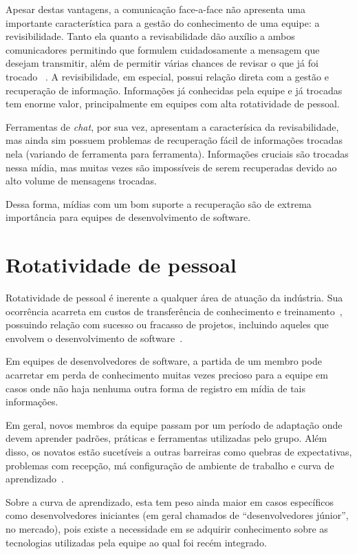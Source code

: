 Apesar destas vantagens, a comunicação face-a-face não apresenta uma importante característica para a gestão do conhecimento de uma equipe: a revisibilidade. Tanto ela quanto a revisabilidade dão auxílio a ambos comunicadores permitindo que formulem cuidadosamente a mensagem que desejam transmitir, além de permitir várias chances de revisar o que já foi trocado ~\cite{Olson2000}. A revisibilidade, em especial, possui relação direta com a gestão e recuperação de informação. Informações já conhecidas pela equipe e já trocadas tem enorme valor, principalmente em equipes com alta rotatividade de pessoal.

Ferramentas de \textit{chat}, por sua vez, apresentam a caracterísica da revisabilidade, mas ainda sim possuem problemas de recuperação fácil de informações trocadas nela (variando de ferramenta para ferramenta). Informações cruciais são trocadas nessa mídia, mas muitas vezes são impossíveis de serem recuperadas devido ao alto volume de mensagens trocadas.

Dessa forma, mídias com um bom suporte a recuperação são de extrema importância para equipes de desenvolvimento de software.

\section{Rotatividade de pessoal}

Rotatividade de pessoal é inerente a qualquer área de atuação da indústria.
Sua ocorrência acarreta em custos de transferência de conhecimento e treinamento~\cite{Hall2008}, possuindo relação com sucesso ou fracasso de projetos, incluindo aqueles que envolvem o desenvolvimento de software~\cite{Hall2008}.

Em equipes de desenvolvedores de software, a partida de um membro pode acarretar em perda de conhecimento muitas vezes precioso para a equipe em casos onde não haja nenhuma outra forma de registro em mídia de tais informações.

Em geral, novos membros da equipe passam por um período de adaptação onde devem aprender padrões, práticas e ferramentas utilizadas pelo grupo. Além disso, os novatos estão sucetíveis a outras barreiras como quebras de expectativas, problemas com recepção, má configuração de ambiente de trabalho e curva de aprendizado~\cite{Steinmacher2015}.

Sobre a curva de aprendizado, esta tem peso ainda maior em casos específicos como desenvolvedores iniciantes (em geral chamados de ``desenvolvedores júnior'', no mercado), pois existe a necessidade em se adquirir conhecimento sobre as tecnologias utilizadas pela equipe ao qual foi recém integrado.

